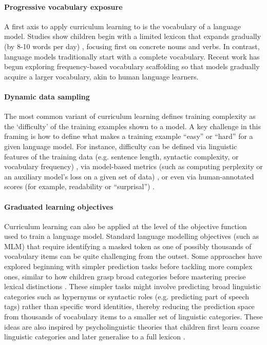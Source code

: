 \paragraph{Progressive vocabulary exposure} A first axis to apply curriculum learning to is the vocabulary of a language model. Studies show children begin with a limited lexicon that expands gradually (by 8-10 words per day) \citep{fenson1994variability, bergelson2015early, weizman2001lexical}, focusing first on concrete nouns and verbs. In contrast, language models traditionally start with a complete vocabulary. Recent work has begun exploring frequency-based vocabulary scaffolding \citep{soviany2022curriculum} so that models gradually acquire a larger vocabulary, akin to human language learners. 

\paragraph{Dynamic data sampling} The most common variant of curriculum learning defines training complexity as the `difficulty' of the training examples shown to a model. A key challenge in this framing is how to define what makes a training example “easy” or “hard” for a given language model. For instance, difficulty can be defined via linguistic features of the training data (e.g. sentence length, syntactic complexity, or vocabulary frequency) \citep{campos2021curriculum, kocmi2017curriculum, liu2018curriculum}, via model-based metrics (such as computing perplexity or an auxiliary model's loss on a given set of data) \citep{sachan2016easy, lalor2020dynamic}, or even via human-annotated scores (for example, readability or “surprisal”) \citep{soviany2022curriculum}. 

\paragraph{Graduated learning objectives} Curriculum learning can also be applied at the level of the objective function used to train a language model. Standard language modelling objectives (such as MLM) that require identifying a masked token as one of possibly thousands of vocabulary items can be quite challenging from the outset. Some approaches have explored beginning with simpler prediction tasks before tackling more complex ones, similar to how children grasp broad categories before mastering precise lexical distinctions \citep{markman1990constraints}. These simpler tasks might involve predicting broad linguistic categories such as hypernyms \citep{bai2022better} or syntactic roles (e.g. predicting part of speech tags) \citep{wang2023language, cui2022lert} rather than specific word identities, thereby reducing the prediction space from thousands of vocabulary items to a smaller set of linguistic categories. These ideas are also inspired by psycholinguistic theories that children first learn coarse linguistic categories and later generalise to a full lexicon \citep{alishahi2010computational, gleitman1990structural}.

